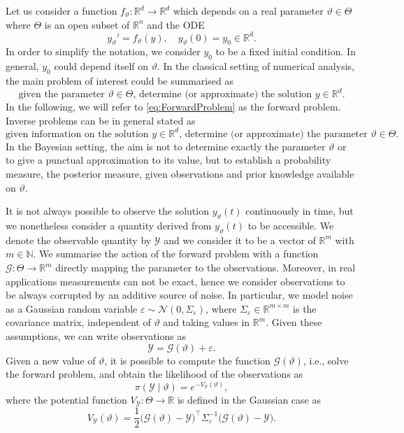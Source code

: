 \documentclass{siamart1116}
\numberwithin{theorem}{section}
\renewcommand{\theta}{\vartheta}
\newcommand{\N}{\mathbb{N}}
\newcommand{\R}{\mathbb{R}}
\newcommand{\epl}{\varepsilon}
\begin{document}
Let us consider a function $f_\theta \colon \R^d \to \R^d$ which depends on a real parameter $\theta \in \Theta$ where $\Theta$ is an open subset of $\R^n$ and the ODE
\begin{equation}\label{eq:ODEParam}
	y_\theta' = f_\theta(y), \quad y_\theta(0) = y_0 \in \R^d.
\end{equation}
In order to simplify the notation, we consider $y_0$ to be a fixed initial condition. In general, $y_0$ could depend itself on $\theta$. In the classical setting of numerical analysis, the main problem of interest could be summarised as  
\begin{equation}\label{eq:ForwardProblem}
	\mbox{given the parameter } \theta \in \Theta \mbox{, determine (or approximate) the solution } y \in \R^d.
\end{equation}
In the following, we will refer to \eqref{eq:ForwardProblem} as the forward problem. Inverse problems can be in general stated as
\begin{equation}
	\mbox{given information on the solution } y \in \R^d \mbox{, determine (or approximate) the parameter } \theta \in \Theta.
\end{equation}
In the Bayesian setting, the aim is not to determine exactly the parameter $\theta$ or to give a punctual approximation to its value, but to establish a probability measure, the posterior measure, given observations and prior knowledge available on $\theta$. 

It is not always possible to observe the solution $y_\theta(t)$ continuously in time, but we nonetheless consider a quantity derived from $y_\theta(t)$ to be accessible. We denote the observable quantity by $\mathcal{Y}$ and we consider it to be a vector of $\R^m$ with $m \in \N$. We summarise the action of the forward problem with a function $\mathcal{G} \colon \Theta \to \R^m$ directly mapping the parameter to the observations. Moreover, in real applications measurements can not be exact, hence we consider observations to be always corrupted by an additive source of noise. In particular, we model noise as a Gaussian random variable $\epl \sim \mathcal{N}(0, \Sigma_\epl)$, where $\Sigma_\epl \in \R^{m \times m}$ is the covariance matrix, independent of $\theta$ and taking values in $\R^m$. Given these assumptions, we can write observations as 
\begin{equation}
	\mathcal{Y} = \mathcal{G}(\theta) + \epl.
\end{equation}
Given a new value of $\theta$, it is possible to compute the function $\mathcal{G}(\theta)$, i.e., solve the forward problem, and obtain the likelihood of the observations as 
\begin{equation}
	\pi(\mathcal{Y} \mid \theta) = e^{-V_\mathcal{Y}(\theta)},
\end{equation}
where the potential function $V_\mathcal{Y}\colon\Theta \to \R$ is defined in the Gaussian case as
\begin{equation}
	V_\mathcal{Y}(\theta) = \frac{1}{2}\big(\mathcal{G}(\theta) - \mathcal{Y}\big)^\top \Sigma_\epl^{-1} \big(\mathcal{G}(\theta) - \mathcal{Y}\big).
\end{equation}
\end{document}
